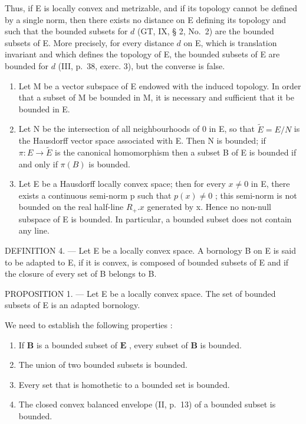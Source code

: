 Thus, if E is locally convex and metrizable, and if its topology cannot be defined by a single norm, then there exists no distance on E defining its topology and such that the bounded subsets for \(d\) (GT, IX, § 2, No.~2) are the bounded subsets of E. More precisely, for every distance \(d\) on E, which is translation invariant and which defines the topology of E, the bounded subsets of E are bounded for \(d\) (III, p.~38, exerc. 3), but the converse is false.

\begin{enumerate}
\def\labelenumi{\arabic{enumi})}
\setcounter{enumi}{1}
\item
  Let M be a vector subspace of E endowed with the induced topology. In order that a subset of M be bounded in M, it is necessary and sufficient that it be bounded in E.
\item
  Let N be the intersection of all neighbourhoods of 0 in E, so that \(\tilde{E} = E/N\) is the Hausdorff vector space associated with E. Then N is bounded; if \(\pi: E \to \tilde{E}\) is the canonical homomorphism then a subset B of E is bounded if and only if \(\pi(B)\) is bounded.
\item
  Let E be a Hausdorff locally convex space; then for every \(x \neq 0\) in E, there exists a continuous semi-norm p such that \(p(x) \neq 0\) ; this semi-norm is not bounded on the real half-line \(R_{+}.x\) generated by x. Hence no non-null subspace of E is bounded. In particular, a bounded subset does not contain any line.
\end{enumerate}

DEFINITION 4. --- Let E be a locally convex space. A bornology B on E is said to be adapted to E, if it is convex, is composed of bounded subsets of E and if the closure of every set of B belongs to B.

PROPOSITION 1. --- Let E be a locally convex space. The set of bounded subsets of E is an adapted bornology.

We need to establish the following properties :

\begin{enumerate}
\def\labelenumi{\alph{enumi})}
\item
  If \(\mathbf{B}\) is a bounded subset of \(\mathbf{E}\) , every subset of \(\mathbf{B}\) is bounded.
\item
  The union of two bounded subsets is bounded.
\item
  Every set that is homothetic to a bounded set is bounded.
\item
  The closed convex balanced envelope (II, p.~13) of a bounded subset is bounded.
\end{enumerate}

